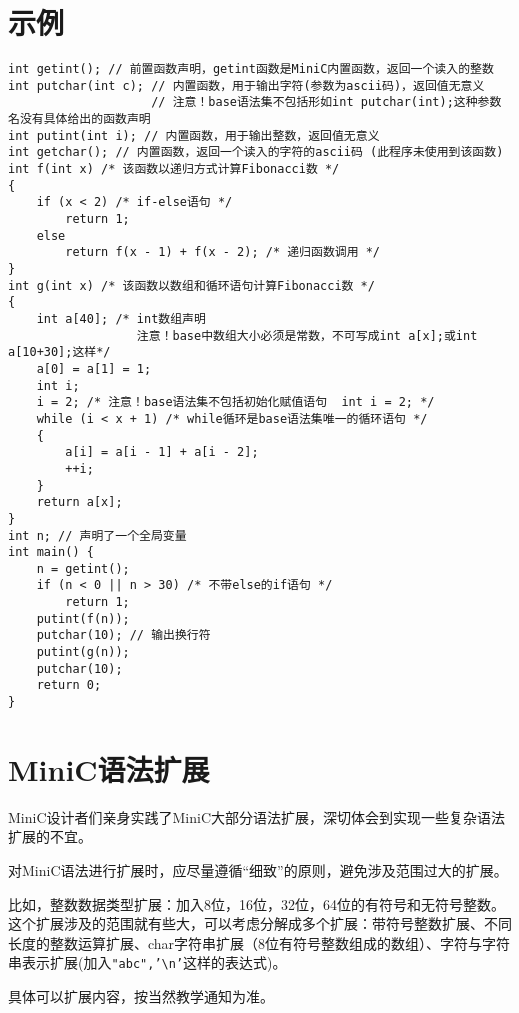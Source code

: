 \documentclass{ctexart}
\begin{document}
\section{示例}
\small
\begin{verbatim}
int getint(); // 前置函数声明，getint函数是MiniC内置函数，返回一个读入的整数
int putchar(int c); // 内置函数，用于输出字符(参数为ascii码)，返回值无意义
                    // 注意！base语法集不包括形如int putchar(int);这种参数名没有具体给出的函数声明
int putint(int i); // 内置函数，用于输出整数，返回值无意义
int getchar(); // 内置函数，返回一个读入的字符的ascii码 (此程序未使用到该函数)
int f(int x) /* 该函数以递归方式计算Fibonacci数 */
{
    if (x < 2) /* if-else语句 */
        return 1;
    else
        return f(x - 1) + f(x - 2); /* 递归函数调用 */
}
int g(int x) /* 该函数以数组和循环语句计算Fibonacci数 */
{
    int a[40]; /* int数组声明
                  注意！base中数组大小必须是常数，不可写成int a[x];或int a[10+30];这样*/
    a[0] = a[1] = 1;
    int i;
    i = 2; /* 注意！base语法集不包括初始化赋值语句  int i = 2; */
    while (i < x + 1) /* while循环是base语法集唯一的循环语句 */
    {
        a[i] = a[i - 1] + a[i - 2];
        ++i;
    }
    return a[x];
}
int n; // 声明了一个全局变量
int main() {
    n = getint();
    if (n < 0 || n > 30) /* 不带else的if语句 */
        return 1;
    putint(f(n));
    putchar(10); // 输出换行符
    putint(g(n));
    putchar(10);
    return 0;
}
\end{verbatim}
\newpage
\normalsize
\section{MiniC语法扩展}
MiniC设计者们亲身实践了MiniC大部分语法扩展，深切体会到实现一些复杂语法扩展的不宜。

对MiniC语法进行扩展时，应尽量遵循“细致”的原则，避免涉及范围过大的扩展。

比如，整数数据类型扩展：加入8位，16位，32位，64位的有符号和无符号整数。这个扩展涉及的范围就有些大，可以考虑分解成多个扩展：带符号整数扩展、不同长度的整数运算扩展、char字符串扩展（8位有符号整数组成的数组）、字符与字符串表示扩展(加入\texttt{"abc",'\textbackslash n'}这样的表达式)。

具体可以扩展内容，按当然教学通知为准。
\end{document}
